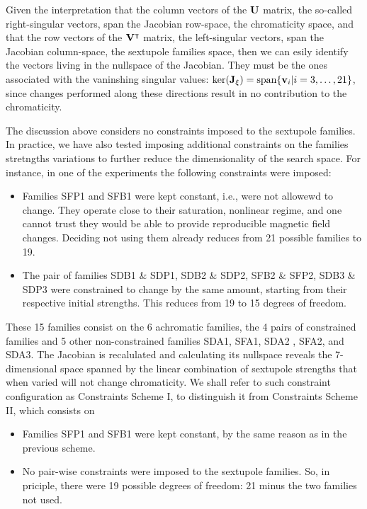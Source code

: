 Given the interpretation that the column vectors of the $\vb{U}$ matrix, the so-called right-singular vectors, span the Jacobian row-space, the chromaticity space, and that the row vectors of the $\vb{V}^\intercal$ matrix, the left-singular vectors, span the Jacobian column-space, the sextupole families space, then we can esily identify the vectors living in the nullspace of the Jacobian. They must be the ones associated with the vaninshing singular values: $\text{ker}(\vb{J}_\xi) = \text{span}\{\vb{v}_i|i=3,\dots,21\}$, since changes performed along these directions result in no contribution to the chromaticity.

The discussion above considers no constraints imposed to the sextupole families. In practice, we have also tested imposing additional constraints on the families stretngths variations to further reduce the dimensionality of the search space. For instance, in one of the experiments the following constraints were imposed:
\begin{itemize}
    \item Families SFP1 and SFB1 were kept constant, i.e., were not allowewd to change. They operate close to their saturation, nonlinear regime, and one cannot trust they would be able to provide reproducible magnetic field changes. Deciding not using them already reduces from 21 possible families to 19.
    \item The pair of families SDB1 \& SDP1, SDB2 \& SDP2, SFB2 \& SFP2, SDB3 \& SDP3 were constrained to change by the same amount, starting from their respective initial strengths. This reduces from 19 to 15 degrees of freedom.
\end{itemize}
These 15 families consist on the 6 achromatic families, the 4 pairs of constrained families and 5 other non-constrained families SDA1, SFA1, SDA2 , SFA2, and SDA3. The Jacobian is recalulated and calculating its nullspace reveals the 7-dimensional space spanned by the linear combination of sextupole strengths that when varied will not change chromaticity. We shall refer to such constraint configuration as Constraints Scheme I, to distinguish it from Constraints Scheme II, which consists on
\begin{itemize}
    \item Families SFP1 and SFB1 were kept constant, by the same reason as in the previous scheme.
    \item No pair-wise constraints were imposed to the sextupole families. So, in priciple, there were 19 possible degrees of freedom: 21 minus the two families not used.
\end{itemize}
